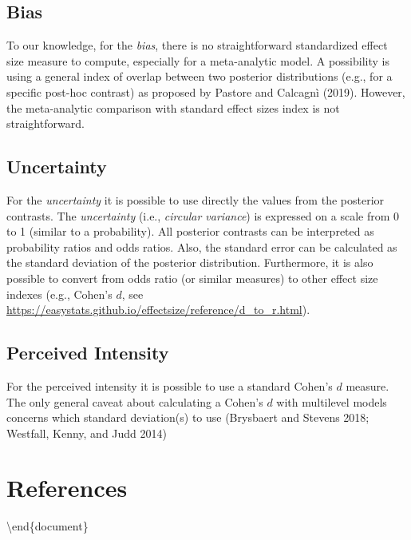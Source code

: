 \documentclass[
]{article}
\begin{document}
\hypertarget{bias-1}{%
\subsection{Bias}\label{bias-1}}

To our knowledge, for the \emph{bias}, there is no straightforward standardized effect size measure to compute, especially for a meta-analytic model. A possibility is using a general index of overlap between two posterior distributions (e.g., for a specific post-hoc contrast) as proposed by Pastore and Calcagnì (2019). However, the meta-analytic comparison with standard effect sizes index is not straightforward.

\hypertarget{uncertainty-1}{%
\subsection{Uncertainty}\label{uncertainty-1}}

For the \emph{uncertainty} it is possible to use directly the values from the posterior contrasts. The \emph{uncertainty} (i.e., \emph{circular variance}) is expressed on a scale from 0 to 1 (similar to a probability). All posterior contrasts can be interpreted as probability ratios and odds ratios. Also, the standard error can be calculated as the standard deviation of the posterior distribution. Furthermore, it is also possible to convert from odds ratio (or similar measures) to other effect size indexes (e.g., Cohen's \(d\), see \url{https://easystats.github.io/effectsize/reference/d_to_r.html}).

\hypertarget{perceived-intensity-2}{%
\subsection{Perceived Intensity}\label{perceived-intensity-2}}

For the perceived intensity it is possible to use a standard Cohen's \(d\) measure. The only general caveat about calculating a Cohen's \(d\) with multilevel models concerns which standard deviation(s) to use (Brysbaert and Stevens 2018; Westfall, Kenny, and Judd 2014)

\hypertarget{references}{%
\section{References}\label{references}}

\textbackslash end\{document\}
\end{document}

